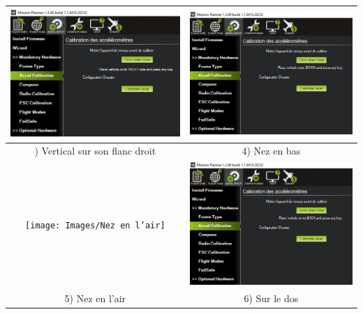 \documentclass[a4paper,12pt]{book}
\begin{document}
\begin{table}[H]
\begin{center}
\begin{tabular}{|c|c|}
\centering
\includegraphics[width=7.5cm]{Images/Vertical sur son flanc droit} & \includegraphics[width=7.5cm]{Images/Nez en bas}
\\
\hline


\centering
3) Vertical sur son flanc droit &   4) Nez en bas \\
\hline


\centering
\texttt{[image: Images/Nez en l’air]} & \includegraphics[width=7.5cm]{Images/Sur le dos}\\
			\hline
			\centering
				
5) Nez en l’air &   6) Sur le dos \\
\hline
\end{tabular}
	\end{center}
\end{table}	


\newpage
\end{document}
